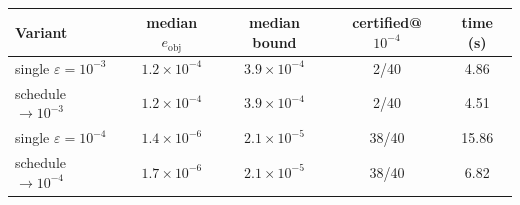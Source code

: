 \begin{tabular}{lcccc}
\toprule
Variant & median $e_{\mathrm{obj}}$ & median bound & certified@$10^{-4}$ & time (s) \\
\midrule
single $\varepsilon=10^{-3}$ & $1.2{\times}10^{-4}$ & $3.9{\times}10^{-4}$ & 2/40 & 4.86 \\
schedule $\to 10^{-3}$ & $1.2{\times}10^{-4}$ & $3.9{\times}10^{-4}$ & 2/40 & 4.51 \\
single $\varepsilon=10^{-4}$ & $1.4{\times}10^{-6}$ & $2.1{\times}10^{-5}$ & 38/40 & 15.86 \\
schedule $\to 10^{-4}$ & $1.7{\times}10^{-6}$ & $2.1{\times}10^{-5}$ & 38/40 & 6.82 \\
\bottomrule
\end{tabular}